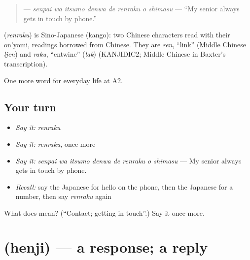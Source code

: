 \begin{quote}
\textbf{    } — \emph{senpai wa itsumo denwa de renraku o shimasu} — \textquotedblleft{}My senior always gets in touch by phone.\textquotedblright{}
\end{quote}

\begin{cousinweb}
\textbf{} (\emph{renraku}) is Sino-Japanese (kango): two Chinese characters read with their on'yomi, readings borrowed from Chinese. They are \emph{ren}, \textquotedblleft{}link\textquotedblright{} (Middle Chinese \emph{ljen}) and \emph{raku}, \textquotedblleft{}entwine\textquotedblright{} (\emph{lak}) (KANJIDIC2; Middle Chinese in Baxter's transcription).
\end{cousinweb}

\begin{grammarlens}[title={What you've built}]
One more word for everyday life at A2.
\end{grammarlens}

\subsection*{Your turn}
\begin{itemize}
\raggedright
  \item \emph{Say it:} \emph{renraku}
  \item \emph{Say it:} \emph{renraku}, once more
  \item \emph{Say it:} \emph{senpai wa itsumo denwa de renraku o shimasu} — My senior always gets in touch by phone.
  \item \emph{Recall:} say the Japanese for hello on the phone, then the Japanese for a number, then say \emph{renraku} again
\end{itemize}

\begin{tcolorbox}[breakable,colback=teal!4,colframe=teal!35!black,title={Before you move on}]
What does  mean? (\textquotedblleft{}Contact; getting in touch\textquotedblright{}.) Say it once more.
\end{tcolorbox}
\section[\texorpdfstring{\ja{へんじ} (henji)}{へんじ (henji)}]{ (henji) — a response; a reply}

\label{lesson:JA-C231-henji}



